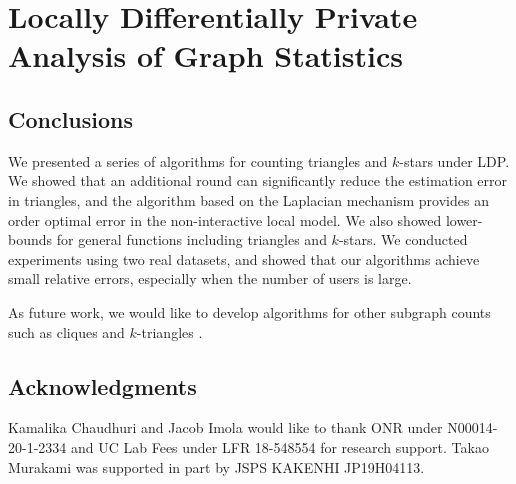 \graphicspath{{./chapters/chapter1}}

\chapter{Locally Differentially Private Analysis of Graph Statistics}






% 


\section{Conclusions}
\label{sec:conclusions}
We presented a series of algorithms for counting triangles and $k$-stars under LDP. 
We 
showed that an additional round can significantly reduce the estimation error in triangles, and the algorithm based on the Laplacian mechanism provides an order optimal error in the non-interactive local model. 
We also showed lower-bounds for general functions including triangles and $k$-stars. 
We conducted experiments using two real datasets, and showed that our algorithms achieve small relative errors, especially when the number of users is large.

As future work, we would like to develop algorithms for other subgraph counts such as cliques and $k$-triangles \cite{Karwa_PVLDB11}. 

\section*{Acknowledgments}
Kamalika Chaudhuri and Jacob Imola would like to thank ONR under N00014-20-1-2334 and UC Lab Fees under LFR 18-548554  for research support. 
Takao Murakami was supported in part by JSPS KAKENHI JP19H04113.



